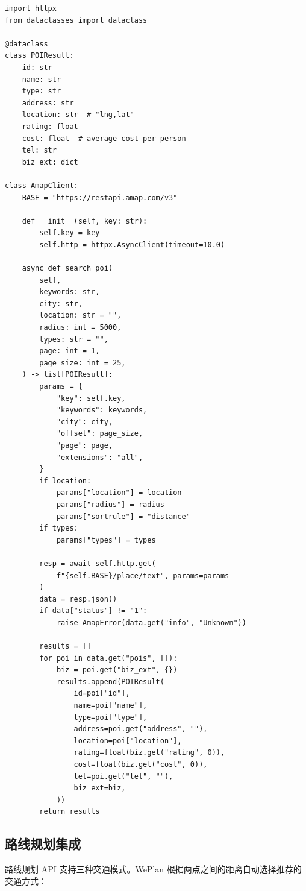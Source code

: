 \documentclass[12pt,a4paper]{ctexart}
\begin{document}
\begin{lstlisting}[caption={高德POI搜索封装},label={lst:amap-poi}]
import httpx
from dataclasses import dataclass

@dataclass
class POIResult:
    id: str
    name: str
    type: str
    address: str
    location: str  # "lng,lat"
    rating: float
    cost: float  # average cost per person
    tel: str
    biz_ext: dict

class AmapClient:
    BASE = "https://restapi.amap.com/v3"

    def __init__(self, key: str):
        self.key = key
        self.http = httpx.AsyncClient(timeout=10.0)

    async def search_poi(
        self,
        keywords: str,
        city: str,
        location: str = "",
        radius: int = 5000,
        types: str = "",
        page: int = 1,
        page_size: int = 25,
    ) -> list[POIResult]:
        params = {
            "key": self.key,
            "keywords": keywords,
            "city": city,
            "offset": page_size,
            "page": page,
            "extensions": "all",
        }
        if location:
            params["location"] = location
            params["radius"] = radius
            params["sortrule"] = "distance"
        if types:
            params["types"] = types

        resp = await self.http.get(
            f"{self.BASE}/place/text", params=params
        )
        data = resp.json()
        if data["status"] != "1":
            raise AmapError(data.get("info", "Unknown"))

        results = []
        for poi in data.get("pois", []):
            biz = poi.get("biz_ext", {})
            results.append(POIResult(
                id=poi["id"],
                name=poi["name"],
                type=poi["type"],
                address=poi.get("address", ""),
                location=poi["location"],
                rating=float(biz.get("rating", 0)),
                cost=float(biz.get("cost", 0)),
                tel=poi.get("tel", ""),
                biz_ext=biz,
            ))
        return results
\end{lstlisting}

\subsection{路线规划集成}

路线规划 API 支持三种交通模式。WePlan 根据两点之间的距离自动选择推荐的交通方式：
\end{document}
